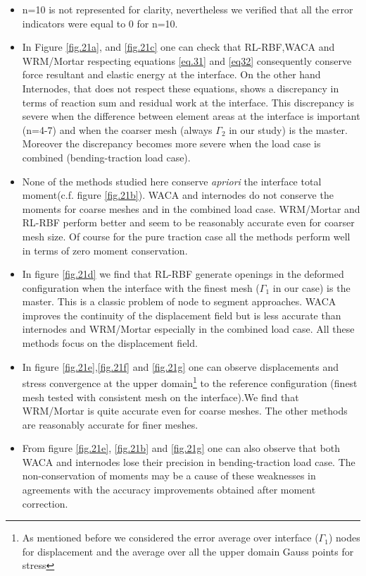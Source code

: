  \begin{itemize}
     \item n=10 is not represented for clarity, nevertheless we verified that all the error indicators were equal to 0 for n=10.
     \item In Figure  \ref{fig.21a}, and \ref{fig.21c} one can check that RL-RBF,WACA and WRM/Mortar respecting equations \eqref{eq.31} and \eqref{eq32} consequently conserve force resultant and elastic energy at the interface. On the other hand Internodes, that does not respect these equations, shows a discrepancy in terms of reaction sum and residual work at the interface. This discrepancy is severe when the difference between element areas at the interface is important (n=4-7) and when the coarser mesh (always $\Gamma_2$ in our study) is the master. Moreover the discrepancy becomes more severe when the load case is combined (bending-traction load case).
     \item None of the methods studied here conserve \textit{apriori} the interface total moment(c.f. figure \ref{fig.21b}). WACA and internodes do not conserve the moments for coarse meshes and in the combined load case. WRM/Mortar and RL-RBF perform better and seem to be reasonably accurate even for coarser mesh size. Of course for the pure traction case all the methods perform well in terms of zero moment conservation.
     \item In figure \ref{fig.21d} we find that RL-RBF generate openings in the deformed configuration when the interface with the finest mesh ($\Gamma_1$ in our case) is the master. This is a classic problem of node to segment approaches. WACA improves the continuity of the displacement field but is less accurate than internodes and WRM/Mortar especially in the combined load case. All these methods focus on the displacement field. 
     \item In figure \ref{fig.21e},\ref{fig.21f} and \ref{fig.21g} one can observe displacements and stress convergence at the upper domain\footnote{As mentioned before we considered the error average over interface ($\Gamma_1$) nodes for displacement and the average over all the upper domain Gauss points for stress} to the reference configuration (finest mesh tested with consistent mesh on the interface).We find that WRM/Mortar is quite accurate even for coarse meshes. The other methods are reasonably accurate for finer meshes.
     \item From figure \ref{fig.21e}, \ref{fig.21b} and \ref{fig.21g} one can also observe that both WACA and internodes lose their precision in bending-traction load case. The non-conservation of moments may be a cause of these weaknesses in agreements with the accuracy improvements obtained after moment correction.

\end{itemize}
